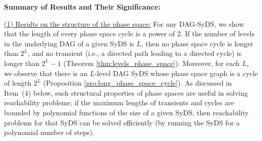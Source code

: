 \smallskip

\noindent
\textbf{Summary of Results and Their Significance:}

\smallskip

\noindent
\underline{(1) Results on the structure of the phase space:}
For any DAG-SyDS, we show that
the length of every phase space cycle is a power of 2.
If the number of levels in the underlying DAG of a given SyDS is $L$,
then no phase space cycle is longer than $2^L$,
and no transient (i.e., a directed path leading to a directed
cycle) is longer than $2^L-1$
(Theorem \ref{thm:levels_phase_space}).
Moreover, for each $L$, we observe that
there is an $L$-level DAG SyDS whose phase 
space graph is a cycle of length $2^L$
(Proposition \ref{pro:long_phase_space_cycle}).
As discussed in Item~(4) below,
such structural properties of phase spaces are useful in solving 
reachability problems; if the maximum lengths of transients
and cycles are bounded by polynomial functions of the size of a given SyDS,
then reachability problems for that SyDS can be solved efficiently
(by running the SyDS for a polynomial number of steps).

\smallskip

